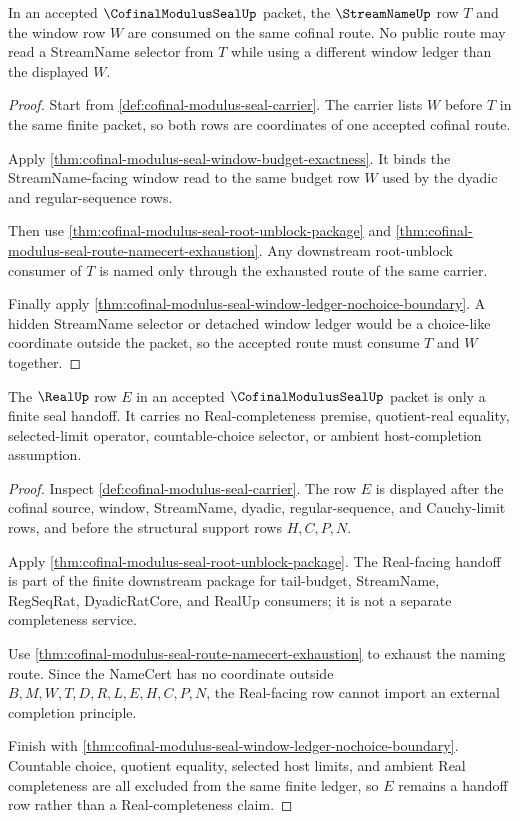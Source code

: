 \begin{theorem}
\label{thm:cofinal-modulus-seal-streamname-window-consistency}
In an accepted $\CofinalModulusSealUp$ packet, the $\StreamNameUp$ row $T$ and the window row $W$ are consumed on the same cofinal route. No public route may read a StreamName selector from $T$ while using a different window ledger than the displayed $W$.
\end{theorem}
\begin{proof}
Start from \autoref{def:cofinal-modulus-seal-carrier}. The carrier lists $W$ before $T$ in the same finite packet, so both rows are coordinates of one accepted cofinal route.

Apply \autoref{thm:cofinal-modulus-seal-window-budget-exactness}. It binds the StreamName-facing window read to the same budget row $W$ used by the dyadic and regular-sequence rows.

Then use \autoref{thm:cofinal-modulus-seal-root-unblock-package} and \autoref{thm:cofinal-modulus-seal-route-namecert-exhaustion}. Any downstream root-unblock consumer of $T$ is named only through the exhausted route of the same carrier.

Finally apply \autoref{thm:cofinal-modulus-seal-window-ledger-nochoice-boundary}. A hidden StreamName selector or detached window ledger would be a choice-like coordinate outside the packet, so the accepted route must consume $T$ and $W$ together.
\end{proof}

\begin{theorem}
\label{thm:cofinal-modulus-seal-realup-noncompleteness-boundary}
The $\RealUp$ row $E$ in an accepted $\CofinalModulusSealUp$ packet is only a finite seal handoff. It carries no Real-completeness premise, quotient-real equality, selected-limit operator, countable-choice selector, or ambient host-completion assumption.
\end{theorem}
\begin{proof}
Inspect \autoref{def:cofinal-modulus-seal-carrier}. The row $E$ is displayed after the cofinal source, window, StreamName, dyadic, regular-sequence, and Cauchy-limit rows, and before the structural support rows $H,C,P,N$.

Apply \autoref{thm:cofinal-modulus-seal-root-unblock-package}. The Real-facing handoff is part of the finite downstream package for tail-budget, StreamName, RegSeqRat, DyadicRatCore, and RealUp consumers; it is not a separate completeness service.

Use \autoref{thm:cofinal-modulus-seal-route-namecert-exhaustion} to exhaust the naming route. Since the NameCert has no coordinate outside $B,M,W,T,D,R,L,E,H,C,P,N$, the Real-facing row cannot import an external completion principle.

Finish with \autoref{thm:cofinal-modulus-seal-window-ledger-nochoice-boundary}. Countable choice, quotient equality, selected host limits, and ambient Real completeness are all excluded from the same finite ledger, so $E$ remains a handoff row rather than a Real-completeness claim.
\end{proof}

